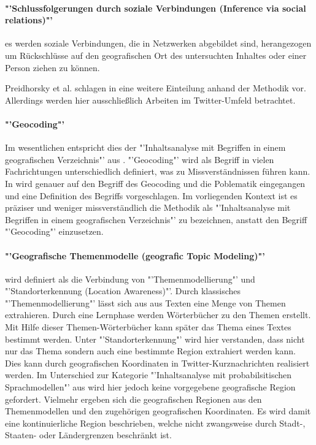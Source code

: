 		\paragraph*{"'Schlussfolgerungen durch soziale Verbindungen (Inference via social relations)"'} es werden soziale Verbindungen, die in Netzwerken abgebildet sind, herangezogen um Rückschlüsse auf den geografischen Ort des untersuchten Inhaltes oder einer Person ziehen zu können.

		Preidhorsky et al. schlagen in \cite{Priedhorsky2013} eine weitere Einteilung anhand der Methodik vor. 
		Allerdings werden hier ausschließlich Arbeiten im Twitter-Umfeld betrachtet. 

		\paragraph*{"'Geocoding"'} Im wesentlichen entspricht dies der "'Inhaltsanalyse mit Begriffen in einem geografischen Verzeichnis"' aus \cite{Cheng2010}. 
		"'Geocoding"' wird als Begriff in vielen Fachrichtungen unterschiedlich definiert, was zu Missverständnissen führen kann. 
		In \cite{bibsmaniaaa:Goldberg2008} wird genauer auf den Begriff des Geocoding und die Poblematik eingegangen und eine Definition  des Begriffs vorgeschlagen.
		Im vorliegenden Kontext ist es präziser und weniger missverständlich die Methodik als "'Inhaltsanalyse mit Begriffen in einem geografischen Verzeichnis"' zu bezeichnen, anstatt den Begriff "'Geocoding"' einzusetzen. 
		
		\paragraph*{"'Geografische Themenmodelle (geografic Topic Modeling)"'} wird definiert als die Verbindung von "'Themenmodellierung"' und "'Standorterkennung (Location Awareness)"'. 
		Durch klassisches "'Themenmodellierung"' lässt sich aus aus Texten eine Menge von Themen extrahieren. 
		Durch eine Lernphase werden Wörterbücher zu den Themen erstellt.
		Mit Hilfe dieser Themen-Wörterbücher kann später das Thema eines Textes bestimmt werden. \cite{Blei2012} 
		Unter "'Standorterkennung"' wird hier verstanden, dass nicht nur das Thema sondern auch eine bestimmte Region extrahiert werden kann. 
		Dies kann durch geografischen Koordinaten in Twitter-Kurznachrichten realisiert werden. 
		Im Unterschied zur Kategorie "'Inhaltsanalyse mit probabilsitischen Sprachmodellen"' aus \cite{Cheng2010} wird hier jedoch keine vorgegebene geografische Region gefordert. 
		Vielmehr ergeben sich die geografischen Regionen aus den Themenmodellen und den zugehörigen geografischen Koordinaten.
		Es wird damit eine kontinuierliche Region beschrieben, welche nicht zwangsweise durch Stadt-, Staaten- oder Ländergrenzen beschränkt ist.  

